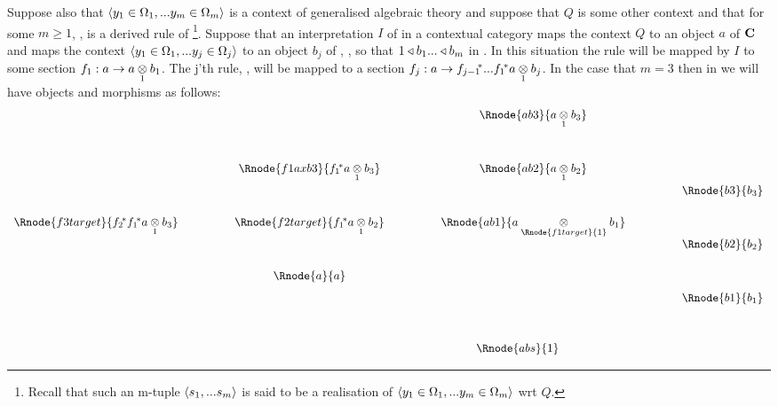 \note
\label{omegarealisationwrtQ}
 Suppose also that $\encyOmega{m}$ is a context of generalised algebraic theory \gatUw and suppose that $Q$ is some other context and that for some $m \geq 1$,
 \foreachj,  is a derived rule of \gatU\footnote{Recall that such an m-tuple $\tuple{\sm}$ is said to be a realisation of 
$\encyOmega{m}$ wrt $Q$.}.  Suppose that an interpretation $I$ of \gatUw in a contextual category \catcw maps the context $Q$ to an object $a$  of $\catc$ and maps
the context $\encyOmega{j}$ to an object $b_j$ of \catc, \foreachj, so that $1 \base b_1 ... \base b_m$ in \catc. In this situation the rule 
 will be mapped by $I$ to some section $f_1:a \morph \crossx{a}{b_1}{1}$. The j'th rule,
, will be mapped to a section $f_j:a \morph \fjpstar ... \fonestar\crossx{a}{b_j}{1}$.
In the case that $m=3$  then in \catcw we will have objects and morphisms as follows:
\begin{displaymath}
\begin{array}{c p{1cm} c p {1cm} c  p{1cm} c}
                                                &&                                           && \Rnode{ab3}{\crossx{a}{b_3}{1}}                       \\[1.2cm]
                                                &&\Rnode{f1axb3}{\fonestar\crossx{a}{b_3}{1}}  && \Rnode{ab2}{\crossx{a}{b_2}{1}}                       \\[1.2cm]
 \Rnode{f3target}{\ftwostar\fonestar\crossx{a}{b_3}{1}} &&\Rnode{f2target}{\fonestar\crossx{a}{b_2}{1}}  && \Rnode{ab1}{\crossx{a}{b_1}{\Rnode{f1target}{1}}}     \\[1.2cm]
                                                &&\Rnode{a}{a}                               &&                                                       \\[-3.0cm]
																								&&                                           &&                         && \Rnode{b3}{b_3}             \\[1.2cm]
																								&&                                           &&                         && \Rnode{b2}{b_2}             \\[1.2cm]
																								&&                                           &&                         && \Rnode{b1}{b_1}             \\[1.1cm]
																								&&                                           && \Rnode{abs}{1} \ \ \ \ \ \ \ \ &&    
\end{array}
\end{displaymath}
